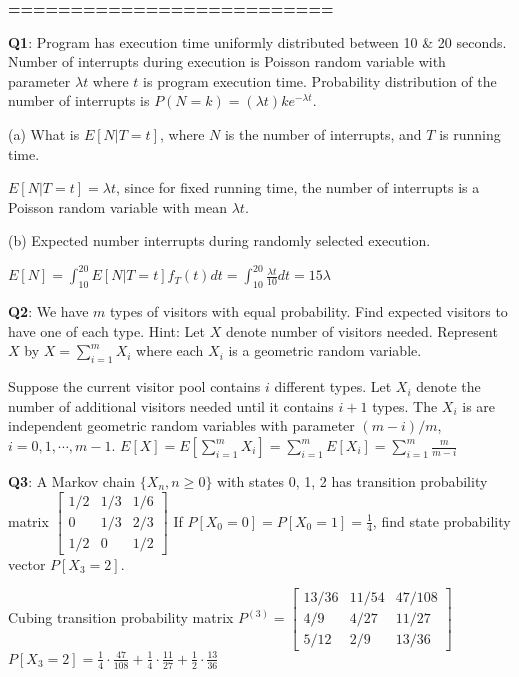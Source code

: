 \documentclass{scrartcl}
\begin{document}
\begin{multicols*}{3}
{\bf ==========================}



{\bf Q1}: Program has execution time uniformly distributed between 10 \& 20 seconds. Number of interrupts during execution is Poisson random variable with parameter $\lambda t$ where $t$ is program execution time. Probability distribution of the number of interrupts is $P(N = k) = (\lambda t)ke^{−\lambda t}$.

(a) What is $E[N|T = t]$, where $N$ is the number of interrupts, and $T$ is running time.

$E[N|T = t] = \lambda t$, since for fixed running time, the number of interrupts is a Poisson random variable with mean $\lambda t$.

(b) Expected number interrupts during randomly selected execution.

$E[N] = \int_{10}^{20} E[N|T=t]f_T(t)dt = \int_{10}^{20}\frac{\lambda t}{10}dt = 15\lambda$



{\bf Q2}: We have $m$ types of visitors with equal probability. Find expected visitors to have one of each type. Hint: Let $X$ denote number of visitors needed. Represent $X$ by $X=\sum_{i=1}^mX_i$ where each $X_i$ is a geometric random variable.

Suppose the current visitor pool contains $i$ different types. Let $X_i$ denote the number of additional visitors needed until it contains $i + 1$ types. The $X_i$ is are independent geometric random variables with parameter $(m - i)/m$, $i = 0, 1, \cdots, m-1$. $E[X]=E[\sum_{i=1}^mX_i]=\sum_{i=1}^mE[X_i]=\sum_{i=1}^m\frac{m}{m-i}$



{\bf Q3}: A Markov chain $\{X_n,n\geq0\}$ with states 0, 1, 2 has transition probability matrix $\begin{bmatrix}
1/2 & 1/3 & 1/6 \\
0 & 1/3 & 2/3 \\
1/2 & 0 & 1/2
\end{bmatrix}$
If $P[X_0=0]=P[X_0=1]=\frac{1}{4}$, find state probability vector $P[X_3=2]$.

Cubing transition probability matrix $P^{(3)}=\begin{bmatrix}
13/36 & 11/54 & 47/108 \\
4/9 & 4/27 & 11/27 \\
5/12 & 2/9 & 13/36
\end{bmatrix}$
$P[X_3=2]=\frac{1}{4}\cdot\frac{47}{108}+\frac{1}{4}\cdot\frac{11}{27}+\frac{1}{2}\cdot\frac{13}{36}$




\end{multicols*}
\end{document}
